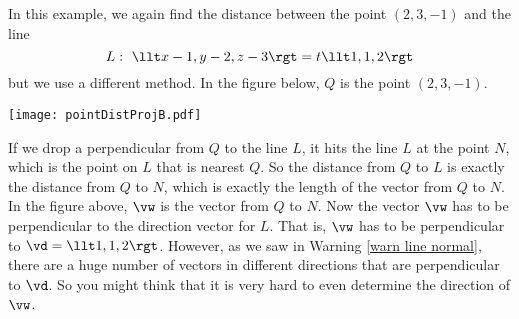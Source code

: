 \begin{eg}
\label{eg:VPdistance-point-line-bis}
In this example, we again find the distance between the point $(2,3,-1)$ 
and the line
\begin{equation*}
L:\  \llt x-1,y-2,z-3\rgt=t\llt 1,1,2\rgt
\end{equation*}
but we use a different method. In the figure below, $Q$ is the point $(2,3,-1)$. 
\begin{efig}
\begin{center}
     \texttt{[image: pointDistProjB.pdf]}
\end{center}
\end{efig}
If we drop a perpendicular from $Q$ to the line $L$, it hits the line $L$ 
at the point $N$, which is the point on $L$ that is nearest $Q$. So 
the distance from $Q$ to $L$ is exactly the distance from $Q$ to $N$, which 
is exactly the length of the vector from $Q$ to $N$. In the figure above,
$\vw$ is the vector from $Q$ to $N$. Now the vector $\vw$ has to be perpendicular to the direction vector for $L$. That is,  $\vw$ has to be perpendicular to $\vd=\llt 1,1,2\rgt$. However, as we saw in Warning
\ref{warn line normal}, there are a huge number of vectors in different 
directions that are perpendicular to $\vd$. So you might think that it is very hard to even determine the direction of $\vw$. 


\end{eg}
